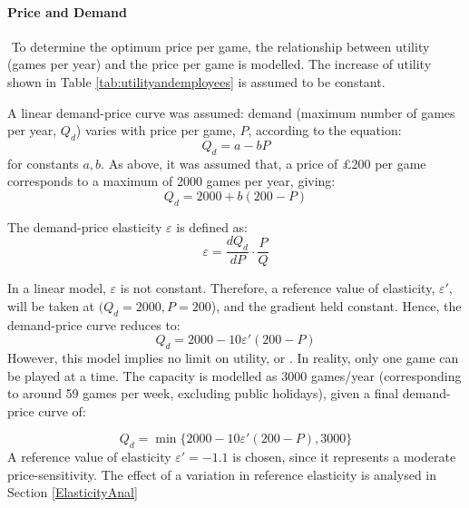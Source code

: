 \documentclass{report_template_oxford}
\begin{document}
\paragraph{Price and Demand}\(\) \newline
To determine the optimum price per game, the relationship between utility (games per year) and the price per game is modelled. The increase of utility shown in Table \ref{tab:utilityandemployees} is assumed to be constant. \newline


\noindent A linear demand-price curve was assumed: demand (maximum number of games per year, \(Q_d\)) varies with price per game, \(P\), according to the equation:
\begin{equation}
    Q_d=a-bP
\end{equation}
for constants \(a, b\).
As above, it was assumed that, a price of £200 per game corresponds to a maximum of 2000 games per year, giving:
\begin{equation}
    Q_d=2000+b(200-P)
\end{equation}

\noindent The demand-price elasticity \(\varepsilon\) is defined as:
\begin{equation}
    \varepsilon=\frac{dQ_d}{dP}\cdot \frac PQ
\end{equation}

\noindent In a linear model, \(\varepsilon\) is not constant. Therefore, a reference value of elasticity, \(\varepsilon'\), will be taken at \((Q_d=2000, P=200\)), and the gradient held constant. Hence, the demand-price curve reduces to:
\begin{equation}
    Q_d=2000-10\varepsilon'(200-P)
\end{equation}
However, this model implies no limit on utility, or . In reality, only one game can be played at a time. The capacity is modelled as 3000 games/year (corresponding to around 59 games per week, excluding public holidays), given a final demand-price curve of:

\begin{equation}
    Q_d=\min\{2000-10\varepsilon'(200-P), 3000\}
\end{equation}
A reference value of elasticity \(\varepsilon'=-1.1\) is chosen, since it represents a moderate price-sensitivity. The effect of a variation in reference elasticity is analysed in Section \ref{ElasticityAnal}
\end{document}
